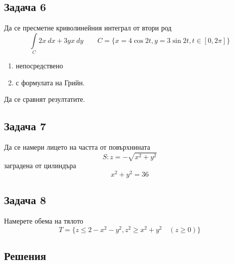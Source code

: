 \documentclass[a4paper,fleqn,12pt]{article}
\theoremstyle{definition}
\begin{document}
\subsection*{Задача 6}
Да се пресметне криволинейния интеграл от втори род
$$\int\limits_C 2x \ dx + 3yx \ dy \qquad C = \{x= 4\cos 2t , y = 3\sin 2t, t \in [0,2\pi] \}$$
\begin{enumerate}
\item непосредствено
\item с формулата на Грийн.
\end{enumerate}
Да се сравнят резултатите. 

\subsection*{Задача 7}
Да се намери лицето на частта от повърхнината 
$$S: z = -\sqrt{x^2 + y^2}$$
заградена от цилиндъра
$$x^2 + y^2 = 36$$

\subsection*{Задача 8}
Намерете обема на тялото
$$T = \{z \leq 2 - x^2 - y^2, z^2 \geq x^2 + y^2 \quad (z \geq 0) \}$$

\newpage
\subsection{Решения}
\end{document}
